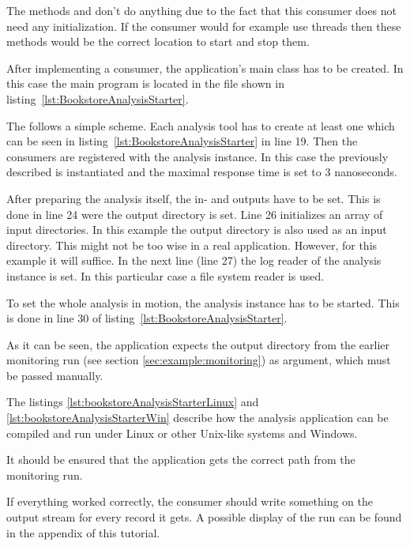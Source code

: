 The methods  and  don't do anything due to the fact that this consumer does not need any initialization. If the consumer would for example use threads then these methods would be the correct location to start and stop them.

After implementing a consumer, the application's main class has to be created. In this case the main program is located in the  file shown in listing~\ref{lst:BookstoreAnalysisStarter}.

\setJavaCodeListing       


\noindent The  follows a simple scheme. Each analysis tool has to create at least one  which can be seen in listing~\ref{lst:BookstoreAnalysisStarter} in line 19. Then the consumers are registered with the analysis instance. In this case the previously described  is instantiated and the maximal response time is set to 3 nanoseconds. 

After preparing the analysis itself, the in- and outputs have to be set. This is done in line 24 were the output directory is set. Line 26 initializes an array of input directories. In this example the output directory is also used as an input directory. This might not be too wise in a real application. However, for this example it will suffice. In the next line (line 27) the log reader of the analysis instance is set. In this particular case a file system reader is used.

To set the whole analysis in motion, the analysis instance has to be started. This is done in line 30 of listing~\ref{lst:BookstoreAnalysisStarter}.

As it can be seen, the application expects the output directory from the earlier monitoring run (see section \ref{sec:example:monitoring}) as argument, which must be passed manually. 

The listings \ref{lst:bookstoreAnalysisStarterLinux} and \ref{lst:bookstoreAnalysisStarterWin} describe how the analysis application can be compiled and run under Linux or other Unix-like systems and Windows.

\setBashListing 		

	
	

It should be ensured that the application gets the correct path from the monitoring run. 

If everything worked correctly, the consumer should write something on the output stream for every record it gets. A possible display of the run can be found in the appendix of this tutorial. 
